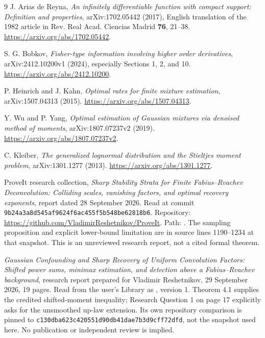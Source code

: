 \documentclass[11pt,a4paper]{article}
\numberwithin{equation}{section}
\theoremstyle{definition}
\theoremstyle{remark}
\begin{document}
\begin{thebibliography}{9}
J. Arias de Reyna,
\emph{An infinitely differentiable function with compact support:
Definition and properties}, arXiv:1702.05442 (2017), English translation
of the 1982 article in Rev. Real Acad. Ciencias Madrid \textbf{76}, 21--38.
\url{https://arxiv.org/abs/1702.05442}.

S. G. Bobkov,
\emph{Fisher-type information involving higher order derivatives},
arXiv:2412.10200v1 (2024), especially Sections 1, 2, and 10.
\url{https://arxiv.org/abs/2412.10200}.

P. Heinrich and J. Kahn,
\emph{Optimal rates for finite mixture estimation},
arXiv:1507.04313 (2015).
\url{https://arxiv.org/abs/1507.04313}.

Y. Wu and P. Yang,
\emph{Optimal estimation of Gaussian mixtures via denoised method of moments},
arXiv:1807.07237v2 (2019).
\url{https://arxiv.org/abs/1807.07237v2}.

C. Kleiber,
\emph{The generalized lognormal distribution and the Stieltjes moment problem},
arXiv:1301.1277 (2013).
\url{https://arxiv.org/abs/1301.1277}.

ProveIt research collection,
\emph{Sharp Stability Strata for Finite Fabius--Rvachev Deconvolution:
Colliding scales, vanishing factors, and optimal recovery exponents},
report dated 28 September 2026.
Read at commit \texttt{9b24a3a8d545af9624f6ac455f5b548be62818b6}.
Repository: \url{https://github.com/VladimirReshetnikov/ProveIt}.
Path: .
The sampling proposition and explicit lower-bound limitation are in source
lines 1190--1234 at that snapshot. This is an unreviewed research report,
not a cited formal theorem.

\emph{Gaussian Confounding and Sharp Recovery of Uniform Convolution Factors:
Shifted power sums, minimax estimation, and detection above a
Fabius--Rvachev background}, research report prepared for Vladimir
Reshetnikov, 29 September 2026, 19 pages.
Read from the user's Library as , version 1.
Theorem 4.1 supplies the credited shifted-moment inequality; Research
Question 1 on page 17 explicitly asks for the unsmoothed up-law extension.
Its own repository comparison is pinned to
\texttt{c130dba623c420551d90db41dae7b3d9cff72dfd}, not the snapshot used
here. No publication or independent review is implied.
\end{thebibliography}
\end{document}
